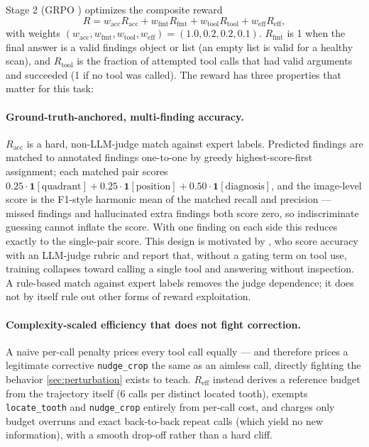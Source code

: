 Stage 2 (GRPO \citep{deepseek2025r1}) optimizes the composite reward
\[
  R = w_{\text{acc}} R_{\text{acc}} + w_{\text{fmt}} R_{\text{fmt}}
    + w_{\text{tool}} R_{\text{tool}} + w_{\text{eff}} R_{\text{eff}},
\]
with weights $(w_{\text{acc}}, w_{\text{fmt}}, w_{\text{tool}}, w_{\text{eff}}) = (1.0, 0.2, 0.2, 0.1)$.
$R_{\text{fmt}}$ is 1 when the final answer is a valid findings object or list (an empty list is valid for a healthy scan),
and $R_{\text{tool}}$ is the fraction of attempted tool calls that had valid arguments and succeeded (1 if no tool was
called). The reward has three properties that matter for this task:

\paragraph{Ground-truth-anchored, multi-finding accuracy.}
$R_{\text{acc}}$ is a hard, non-LLM-judge match against expert labels. Predicted findings are
matched to annotated findings one-to-one by greedy highest-score-first assignment; each matched
pair scores $0.25 \cdot
\mathbf{1}[\text{quadrant}] + 0.25 \cdot \mathbf{1}[\text{position}] + 0.50 \cdot
\mathbf{1}[\text{diagnosis}]$, and the image-level score is the F1-style harmonic mean of the
matched recall and precision --- missed findings and hallucinated extra findings both score
zero, so indiscriminate
guessing cannot inflate the score. With one finding on each side this reduces exactly
to the single-pair score. This design is motivated by \citet{oralgptplus2026}, who score accuracy with an LLM-judge rubric and report
that, without a gating term on tool use, training collapses toward calling a single tool and answering without
inspection. A rule-based match against expert labels removes the judge dependence; it does not by itself rule out
other forms of reward exploitation.

\paragraph{Complexity-scaled efficiency that does not fight correction.}
A naive per-call penalty prices every tool call equally --- and therefore prices a legitimate
corrective \texttt{nudge\_crop} the same as an aimless call, directly fighting the behavior
\cref{sec:perturbation} exists to teach. $R_{\text{eff}}$ instead derives a reference budget
from the trajectory itself (6 calls per distinct located tooth), exempts \texttt{locate\_tooth}
and \texttt{nudge\_crop} entirely from per-call cost, and charges only budget overruns and
exact back-to-back repeat calls (which yield no new information), with a smooth drop-off rather
than a hard cliff.

